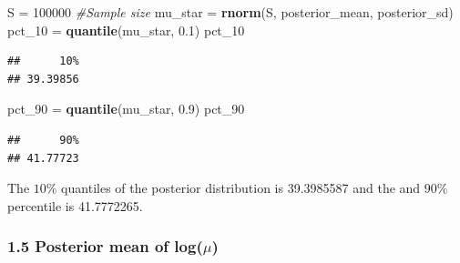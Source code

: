 \documentclass[
]{article}
\newenvironment{Shaded}{\begin{snugshade}}{\end{snugshade}}
\newcommand{\CommentTok}[1]{\textcolor[rgb]{0.56,0.35,0.01}{\textit{#1}}}
\newcommand{\DecValTok}[1]{\textcolor[rgb]{0.00,0.00,0.81}{#1}}
\newcommand{\FloatTok}[1]{\textcolor[rgb]{0.00,0.00,0.81}{#1}}
\newcommand{\KeywordTok}[1]{\textcolor[rgb]{0.13,0.29,0.53}{\textbf{#1}}}
\newcommand{\NormalTok}[1]{#1}
\newcommand{\StringTok}[1]{\textcolor[rgb]{0.31,0.60,0.02}{#1}}
\begin{document}
\begin{Shaded}
\begin{Highlighting}[]
\NormalTok{S =}\StringTok{ }\DecValTok{100000} \CommentTok{#Sample size}
\NormalTok{mu_star =}\StringTok{ }\KeywordTok{rnorm}\NormalTok{(S, posterior_mean, posterior_sd)}
\NormalTok{pct_}\DecValTok{10}\NormalTok{ =}\StringTok{ }\KeywordTok{quantile}\NormalTok{(mu_star, }\FloatTok{0.1}\NormalTok{)}
\NormalTok{pct_}\DecValTok{10}
\end{Highlighting}
\end{Shaded}

\begin{verbatim}
##      10% 
## 39.39856
\end{verbatim}

\begin{Shaded}
\begin{Highlighting}[]
\NormalTok{pct_}\DecValTok{90}\NormalTok{ =}\StringTok{ }\KeywordTok{quantile}\NormalTok{(mu_star, }\FloatTok{0.9}\NormalTok{)}
\NormalTok{pct_}\DecValTok{90}
\end{Highlighting}
\end{Shaded}

\begin{verbatim}
##      90% 
## 41.77723
\end{verbatim}

The \(10\%\) quantiles of the posterior distribution is 39.3985587 and
the and \(90\%\) percentile is 41.7772265.

\hypertarget{posterior-mean-of-logmu}{%
\subsubsection{\texorpdfstring{1.5 Posterior mean of
log(\(\mu\))}{1.5 Posterior mean of log(\textbackslash mu)}}\label{posterior-mean-of-logmu}}
\end{document}

